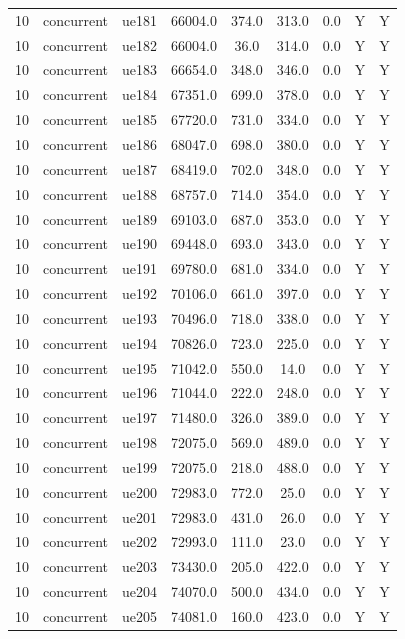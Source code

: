 \begin{table}[ht]
\begin{tabular}{|c|c|c|c|c|c|c|c|c|}
10 & concurrent & ue181 & 66004.0 & 374.0 & 313.0 & 0.0 & Y & Y \\
10 & concurrent & ue182 & 66004.0 & 36.0 & 314.0 & 0.0 & Y & Y \\
10 & concurrent & ue183 & 66654.0 & 348.0 & 346.0 & 0.0 & Y & Y \\
10 & concurrent & ue184 & 67351.0 & 699.0 & 378.0 & 0.0 & Y & Y \\
10 & concurrent & ue185 & 67720.0 & 731.0 & 334.0 & 0.0 & Y & Y \\
10 & concurrent & ue186 & 68047.0 & 698.0 & 380.0 & 0.0 & Y & Y \\
10 & concurrent & ue187 & 68419.0 & 702.0 & 348.0 & 0.0 & Y & Y \\
10 & concurrent & ue188 & 68757.0 & 714.0 & 354.0 & 0.0 & Y & Y \\
10 & concurrent & ue189 & 69103.0 & 687.0 & 353.0 & 0.0 & Y & Y \\
10 & concurrent & ue190 & 69448.0 & 693.0 & 343.0 & 0.0 & Y & Y \\
10 & concurrent & ue191 & 69780.0 & 681.0 & 334.0 & 0.0 & Y & Y \\
10 & concurrent & ue192 & 70106.0 & 661.0 & 397.0 & 0.0 & Y & Y \\
10 & concurrent & ue193 & 70496.0 & 718.0 & 338.0 & 0.0 & Y & Y \\
10 & concurrent & ue194 & 70826.0 & 723.0 & 225.0 & 0.0 & Y & Y \\
10 & concurrent & ue195 & 71042.0 & 550.0 & 14.0 & 0.0 & Y & Y \\
10 & concurrent & ue196 & 71044.0 & 222.0 & 248.0 & 0.0 & Y & Y \\
10 & concurrent & ue197 & 71480.0 & 326.0 & 389.0 & 0.0 & Y & Y \\
10 & concurrent & ue198 & 72075.0 & 569.0 & 489.0 & 0.0 & Y & Y \\
10 & concurrent & ue199 & 72075.0 & 218.0 & 488.0 & 0.0 & Y & Y \\
10 & concurrent & ue200 & 72983.0 & 772.0 & 25.0 & 0.0 & Y & Y \\
10 & concurrent & ue201 & 72983.0 & 431.0 & 26.0 & 0.0 & Y & Y \\
10 & concurrent & ue202 & 72993.0 & 111.0 & 23.0 & 0.0 & Y & Y \\
10 & concurrent & ue203 & 73430.0 & 205.0 & 422.0 & 0.0 & Y & Y \\
10 & concurrent & ue204 & 74070.0 & 500.0 & 434.0 & 0.0 & Y & Y \\
10 & concurrent & ue205 & 74081.0 & 160.0 & 423.0 & 0.0 & Y & Y \\

\end{tabular}
\end{table}
